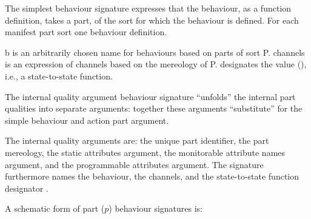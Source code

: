 \begynd
\pind The simplest behaviour signature expresses
\begynd
\pind that the behaviour, as a function definition, 
\pind takes a part,
\pind of the sort
\pind for which the behaviour is defined.
\afslut
\pind For each manifest part sort one behaviour definition.
\afslut

\vspace{2mm}
 

\noindent
\begynd
\pind \textsf{b} is an arbitrarily chosen name for behaviours based on
      parts of sort  \textsf{P}.
\pind \textsf{channels} is an expression of channels based on the
      mereology of \textsf{P}.
\pind {} designates the value \textsf{()}, i.e., a
      state-to-state function.
\afslut



\label{Internal Quality Argument Behaviour Signatures}


\begynd
\pind The  internal quality argument behaviour signature \nyl ``unfolds'' the internal part
      qualities \nyl into separate arguments:
\begynd
\pind together these arguments 
\pind ``substitute'' for the simple behaviour
      and 
\pind action part argument.
\afslut
\afslut
\afslut

\begynd
\pind The internal quality arguments are:
\begynd
\pind the unique part identifier,
\pind the part mereology,
\pind the static attributes argument,
\pind the monitorable attribute names argument, and
\pind the programmable attributes argument.
\afslut
\pind The signature furthermore 
\begynd
\pind names the behaviour,
\pind the channels, and
\pind the state-to-state function designator .
\afslut
\afslut
\enew

\begynd
\pind A schematic form of part ($p$) behaviour signatures is:


